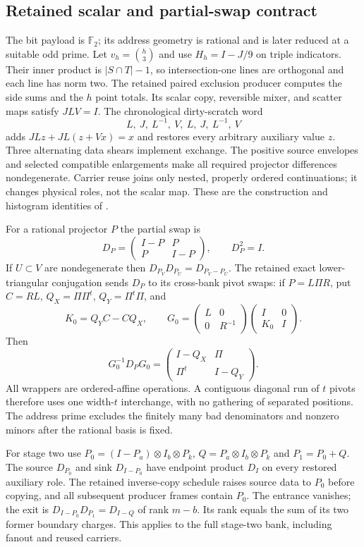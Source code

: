 \subsection{Retained scalar and partial-swap contract}
The bit payload is $\mathbb F_2$; its address geometry is rational and
is later reduced at a suitable odd prime. Let $v_h=\binom h3$ and use
$H_h=I-J/9$ on triple indicators. Their inner product is
$|S\cap T|-1$, so intersection-one lines are orthogonal and each line
has norm two. The retained paired exclusion producer computes the
side sums and the $h$ point totals. Its scalar copy, reversible mixer,
and scatter maps satisfy $JLV=I$. The chronological dirty-scratch word
\[
 L,\ J,\ L^{-1},\ V,\ L,\ J,\ L^{-1},\ V
\]
adds $JLz+JL(z+Vx)=x$ and restores every arbitrary auxiliary value $z$.
Three alternating data shears implement exchange. The positive source
envelopes and selected compatible enlargements make all required
projector differences nondegenerate. Carrier reuse joins only nested,
properly ordered continuations; it changes physical roles, not the
scalar map. These are the construction and histogram identities of
.

For a rational projector $P$ the partial swap is
\[
 D_P=\begin{pmatrix}I-P&P\\P&I-P\end{pmatrix},\qquad D_P^2=I.
\]
If $U\subset V$ are nondegenerate then
$D_{P_V}D_{P_U}=D_{P_V-P_U}$. The retained exact lower-triangular
conjugation sends $D_P$ to its cross-bank pivot swaps: if
$P=L\Pi R$, put $C=RL$, $Q_X=\Pi\Pi^t$, $Q_Y=\Pi^t\Pi$, and
\[
 K_0=Q_YC-CQ_X,\qquad
 G_0=\begin{pmatrix}L&0\\0&R^{-1}\end{pmatrix}
     \begin{pmatrix}I&0\\K_0&I\end{pmatrix}.
\]
Then
\[
 G_0^{-1}D_PG_0=
 \begin{pmatrix}I-Q_X&\Pi\\\Pi^t&I-Q_Y\end{pmatrix}.
\]
All wrappers are ordered-affine operations. A contiguous diagonal run
of $t$ pivots therefore uses one width-$t$ interchange, with no gathering
of separated positions. The address prime excludes the finitely many
bad denominators and nonzero minors after the rational basis is fixed.

For stage two use $P_0=(I-P_a)\otimes I_b\otimes P_k$,
$Q=P_a\otimes I_b\otimes P_k$ and $P_1=P_0+Q$.
The source $D_{P_0}$ and sink $D_{I-P_0}$ have endpoint product $D_I$
on every restored auxiliary role. The retained inverse-copy schedule
raises source data to $P_0$ before copying, and all subsequent producer
frames contain $P_0$. The entrance vanishes; the exit is
$D_{I-P_0}D_{P_1}=D_{I-Q}$ of rank $m-b$. Its rank equals the sum of
its two former boundary charges. This applies to the full stage-two
bank, including fanout and reused carriers.

